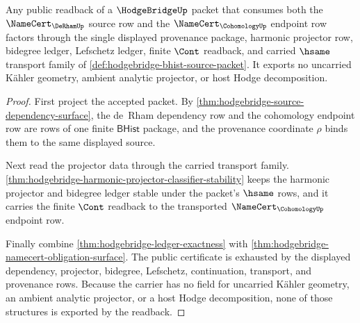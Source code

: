 \begin{theorem}
\label{thm:hodgebridge-shared-projector-readback-exactness}
Any public readback of a $\HodgeBridgeUp$ packet that consumes both the
$\NameCert_{\DeRhamUp}$ source row and the $\NameCert_{\CohomologyUp}$
endpoint row factors through the single displayed provenance package, harmonic
projector row, bidegree ledger, Lefschetz ledger, finite $\Cont$ readback, and
carried $\hsame$ transport family of
\autoref{def:hodgebridge-bhist-source-packet}. It exports no uncarried K\"{a}hler
geometry, ambient analytic projector, or host Hodge decomposition.
\end{theorem}
\begin{proof}
First project the accepted packet. By
\autoref{thm:hodgebridge-source-dependency-surface}, the de~Rham dependency
row and the cohomology endpoint row are rows of one finite $\mathsf{BHist}$
package, and the provenance coordinate $\rho$ binds them to the same displayed
source.

Next read the projector data through the carried transport family.
\autoref{thm:hodgebridge-harmonic-projector-classifier-stability} keeps the
harmonic projector and bidegree ledger stable under the packet's $\hsame$
rows, and it carries the finite $\Cont$ readback to the transported
$\NameCert_{\CohomologyUp}$ endpoint row.

Finally combine \autoref{thm:hodgebridge-ledger-exactness} with
\autoref{thm:hodgebridge-namecert-obligation-surface}. The public certificate
is exhausted by the displayed dependency, projector, bidegree, Lefschetz,
continuation, transport, and provenance rows. Because the carrier has no field
for uncarried K\"{a}hler geometry, an ambient analytic projector, or a host Hodge
decomposition, none of those structures is exported by the readback.
\end{proof}

